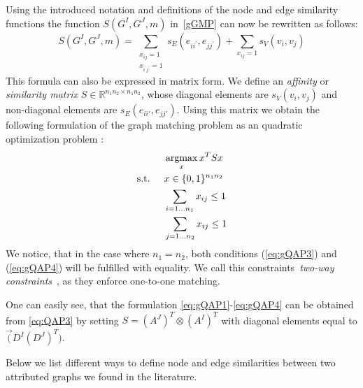 Using the introduced notation and definitions of the node and edge similarity functions the function $S(G^I,G^J,m)$ in~\eqref{gGMP} can now be rewritten as follows:
\begin{equation}\label{eq:sumQAP}
	S(G^I,G^J,m)=\sum_{\substack{x_{ij}=1\\x_{i^\prime j^\prime}=1}}s_E(e_{ii^\prime},e_{jj^\prime}) + \sum_{x_{ij}=1}s_V(v_{i},v_{j})
\end{equation}
This formula can also be expressed in matrix form. We define an \emph{affinity} or \emph{similarity matrix} $S\in\mathbb{R}^{n_1n_2\times n_1n_2}$, whose diagonal elements are $s_V(v_i, v_j)$ and non-diagonal elements are $s_E(e_{ii\prime}, e_{jj\prime})$. Using this matrix we obtain the following formulation of the graph matching problem as an quadratic optimization problem \cite{Cho2010_RRWM, Cho2012_ProgressiveGM,Cho2014_Haystack, Conte2004,Rangarajan1996_GAGM,Leordeanu2005_SM,Leordeanu2009_IPFP}:
\begin{alignat}{2}
    &     && \argmax_x{x^TSx}                           \label{eq:gQAP1}\\ %
    & \text{s.t. } &&  x\in \{0,1\}^{n_1n_2}            \label{eq:gQAP2}\\
    &             &&  \sum_{i=1\dots n_1} x_{ij}\le 1    \label{eq:gQAP3}\\
    &             &&  \sum_{j=1\dots n_2} x_{ij}\le 1    \label{eq:gQAP4}
\end{alignat}
We notice, that in the case where $n_1=n_2$, both conditions (\ref{eq:gQAP3}) and (\ref{eq:gQAP4}) will be fulfilled with equality. We call this constraints~\emph{two-way constraints}~\cite{Rangarajan1996_GAGM}, as they enforce one-to-one matching.

One can easily see, that the formulation \eqref{eq:gQAP1}-\eqref{eq:gQAP4} can be obtained from \eqref{eq:QAP3} by setting $S=(A^J)^T\otimes(A^I)^T$ with diagonal elements equal to $\vec(D^I(D^J)^T)$.

Below we list different ways to define node and edge similarities between two attributed graphs we found in the literature.

